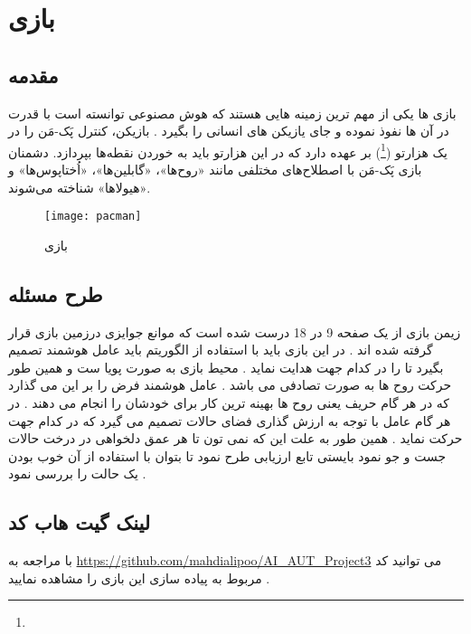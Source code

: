 \chapter{بازی }
\section{مقدمه}
\par
بازی ها یکی از مهم ترین زمینه هایی هستند که هوش مصنوعی توانسته است با قدرت در آن ها نفوذ نموده و جای یازیکن های انسانی را بگیرد . بازیکن، کنترل پَک-مَن را در یک هزارتو (\footnote{}) بر عهده دارد که در این هزارتو باید به خوردن نقطه‌ها بپردازد. دشمنان بازی پَک-مَن با اصطلاح‌های مختلفی مانند «روح‌ها»، «گابلین‌ها»، «اُختاپوس‌ها» و «هیولاها» شناخته می‌شوند.
\begin{figure}[h]
	\texttt{[image: pacman]}
	\centering
	\caption{بازی }
	\cite{NoahWardrip}
	\label{fig2}
\end{figure} 
\section{طرح مسئله}
زیمن بازی از یک صفحه 9 در 18 درست شده است که موانع جوایزی درزمین بازی قرار گرفته شده اند . در این بازی باید با استفاده از الگوریتم 
باید عامل هوشمند تصمیم بگیرد تا 
را در کدام جهت هدایت نماید . محیط بازی به صورت پویا ست و همین طور حرکت روح ها به صورت تصادفی می باشد . عامل هوشمند فرض را بر این می گذارد که در هر گام حریف یعنی روح ها بهینه ترین کار برای خودشان را انجام می دهند . در هر گام عامل با توجه به ارزش گذاری فضای حالات تصمیم می گیرد که در کدام جهت حرکت نماید . همین طور به علت این که نمی تون تا هر عمق دلخواهی در درخت حالات جست و جو نمود بایستی تابع ارزیابی طرح نمود تا بتوان با استفاده از آن خوب بودن یک حالت را بررسی نمود .

\section{لینک گیت هاب کد}
با مراجعه به 
\url{https://github.com/mahdialipoo/AI_AUT_Project3}
می توانید کد مربوط به پیاده سازی این بازی را مشاهده نمایید .
